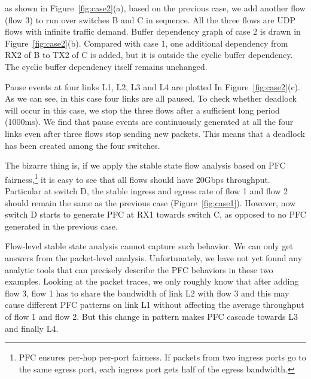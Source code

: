  as shown in Figure~\ref{fig:case2}(a), based on the previous case, we 
add another flow (flow 3) to run over switches B and C in sequence. All the three flows are UDP 
flows with infinite traffic demand. Buffer dependency graph of case 2 is drawn in Figure~\ref{fig:case2}(b). 
Compared with case 1, one additional dependency from RX2 of B to TX2 of C is added, but it
is outside the cyclic buffer dependency. The cyclic buffer dependency itself remains unchanged.

Pause events at four links L1, L2, L3 and L4 are plotted In Figure~\ref{fig:case2}(c). As we can see, in 
this case four links are all paused. To check whether deadlock will occur in this case, we stop the three 
flows after a sufficient long period (1000ms). We find that pause events are continuously 
generated at all the four links even after three flows stop sending new packets. 
This means that a deadlock has been created among the four switches.

The bizarre thing is, if we apply the stable state flow analysis based on PFC fairness,\footnote{PFC
ensures per-hop per-port fairness. If packets from two ingress ports go to the same egress port, each ingress 
port gets half of the egress bandwidth.} it is easy to see that all flows should have 20Gbps throughput.
Particular at switch D, the stable ingress and egress rate of flow 1 and flow 2 should remain the same as
the previous case (Figure~\ref{fig:case1}). However, now switch D starts to generate PFC at RX1 towards 
switch C, as opposed to no PFC generated in the previous case. 


Flow-level stable state analysis cannot capture such behavior. We can only get answers from the 
packet-level analysis. Unfortunately, we have not yet found any analytic tools that can precisely
describe the PFC behaviors in these two examples. Looking at the packet traces, we only roughly know that 
after adding flow 3, flow 1 has to share the bandwidth of link L2 with flow 3 and this may cause
different PFC patterns on link L1 without affecting the average throughput of flow 1 and flow 2.
But this change in pattern makes PFC cascade towards L3 and finally L4.


